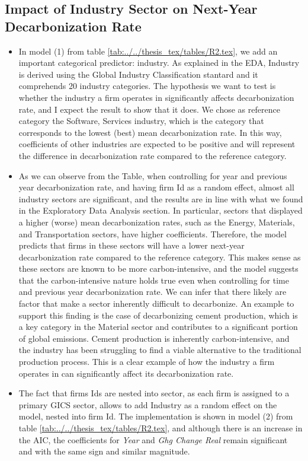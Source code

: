 \subsection{Impact of Industry Sector on Next-Year Decarbonization Rate}
\begin{itemize}
\item In model (1) from table \ref{tab:../../thesis_tex/tables/R2.tex}, we add an important categorical predictor: industry. As explained in the EDA, Industry is derived using the Global Industry Classification stantard and it comprehends 20 industry categories. The hypothesis we want to test is whether the industry a firm operates in significantly affects decarbonization rate, and I expect the result to show that it does. We chose as reference category the Software, Services industry, which is the category that corresponds to the lowest (best) mean decarbonization rate. In this way, coefficients of other industries are expected to be positive and will represent the difference in decarbonization rate compared to the reference category.
\item As we can observe from the Table, when controlling for year and previous year decarbonization rate, and having firm Id as a random effect, almost all industry sectors are significant, and the results are in line with what we found in the Exploratory Data Analysis section. In particular, sectors that displayed a higher (worse) mean decarbonization rates, such as the Energy, Materials, and Transportation sectors, have higher coefficients. Therefore, the model predicts that firms in these sectors will have a lower next-year decarbonization rate compared to the reference category. This makes sense as these sectors are known to be more carbon-intensive, and the model suggests that the carbon-intensive nature holds true even when controlling for time  and previous year decarbonization rate. We can infer that there likely are factor that make a sector inherently difficult to decarbonize. An example to support this finding is the case of decarbonizing cement production, which is a key category in the Material sector and contributes to a significant portion of global emissions. Cement production is inherently carbon-intensive, and the industry has been struggling to find a viable alternative to the traditional production process. This is a clear example of how the industry a firm operates in can significantly affect its decarbonization rate.
\item The fact that firms Ids are nested into sector, as each firm is assigned to a primary GICS sector, allows to add Industry as a random effect on the model, nested into firm Id. The implementation is shown in model (2) from table \ref{tab:../../thesis_tex/tables/R2.tex}, and although there is an increase in the AIC, the coefficients for \textit{Year} and \textit{Ghg Change Real} remain significant and with the same sign and similar magnitude. 
\end{itemize}

